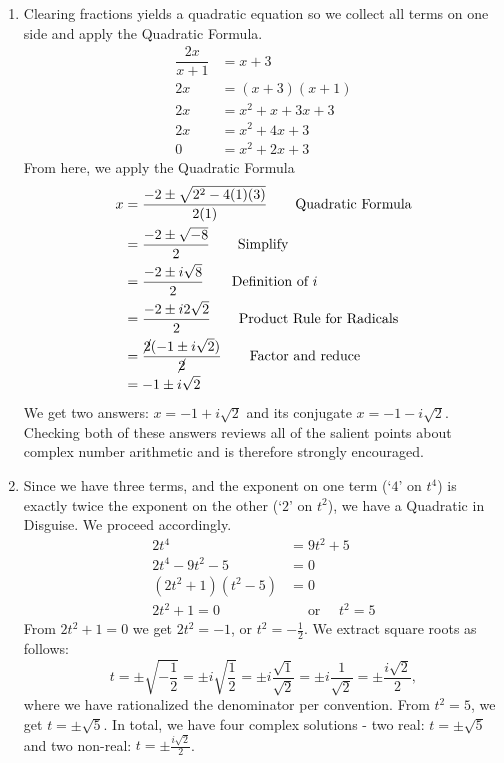 {
\begin{enumerate}


\item  Clearing fractions yields a quadratic equation so we collect all terms on one side and apply the Quadratic Formula.
\begin{align*}
\dfrac{2x}{x+1} & =   x+3  \\
2x & =  (x+3)(x+1)  \tag*{Clear denominators} \\
2x & =  x^2 + x + 3x + 3  \tag*{F.O.I.L.} \\
2x & =  x^2 + 4x + 3  \tag*{Gather like terms} \\
 0 & =  x^2 + 2x + 3  \tag*{Subtract $2x$}
\end{align*}
From here, we apply the Quadratic Formula 
\begin{align*}
x  & =   \dfrac{-2 \pm \sqrt{2^2 - 4(1)(3)}}{2(1)}   \tag*{Quadratic Formula}\\
    & =   \dfrac{-2 \pm \sqrt{-8}}{2}  \tag*{Simplify}\\
	& =   \dfrac{-2 \pm i \sqrt{8}}{2}  \tag*{Definition of $i$}\\
	& =   \dfrac{-2 \pm i 2\sqrt{2}}{2}  \tag*{Product Rule for Radicals}\\
	& =  \dfrac{\cancel{2}(-1 \pm i\sqrt{2})}{\cancel{2}} \tag*{Factor and reduce}\\
	& =  -1 \pm i \sqrt{2} 
\end{align*}	
We get two answers: $x = -1 + i\sqrt{2}$ and its conjugate $x = -1 - i\sqrt{2}$.  Checking both of these answers reviews all of the salient points about complex number arithmetic and is therefore strongly encouraged.

\item  Since we have three terms, and the exponent on one term (`$4$' on $t^4$) is exactly twice the exponent on the other (`$2$' on $t^2$), we have a Quadratic in Disguise.  We proceed accordingly.
\begin{align*}
2t^4 & =  9t^2 + 5  \\
2t^4 - 9t^2 - 5 & =  0  \tag*{Subtract $9t^2$ and $5$} \\
(2t^2 + 1)(t^2 - 5) & =  0  \tag*{Factor} \\
2t^2 + 1 = 0 & \quad \text{ or } \quad  t^2 = 5  \tag*{Zero Product Property}
\end{align*}
From $2t^2 + 1 = 0$ we get $2t^2 = -1$, or $t^2 = -\frac{1}{2}$.  We extract square roots as follows: 
\[
 t = \pm \sqrt{-\dfrac{1}{2}} = \pm i \sqrt{\dfrac{1}{2}} = \pm i \dfrac{\sqrt{1}}{\sqrt{2}} = \pm i \dfrac{1}{\sqrt{2}} = \pm \dfrac{i \sqrt{2}}{2},
\]
where we have rationalized the denominator per convention.  From $t^2 = 5$, we get $t = \pm \sqrt{5}$. In total, we have four complex solutions - two real: $t = \pm \sqrt{5}$ and two non-real: $t = \pm \frac{i \sqrt{2}}{2}$.


\end{enumerate}}
